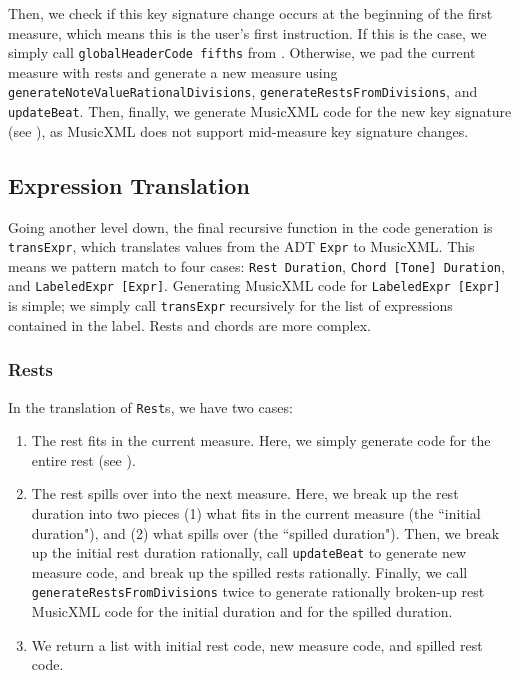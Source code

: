 \documentclass{report}
\begin{document}
Then, we check if this key signature change occurs at the beginning of the first measure, which means this is the user's first instruction. If this is the case, we simply call \verb.globalHeaderCode fifths. from . Otherwise, we pad the current measure with rests and generate a new measure using \verb.generateNoteValueRationalDivisions., \verb.generateRestsFromDivisions., and \verb.updateBeat.. Then, finally, we generate MusicXML code for the new key signature (see ), as MusicXML does not support mid-measure key signature changes. 

\subsection{Expression Translation}

Going another level down, the final recursive function in the code generation is \verb.transExpr., which translates values from the ADT \verb.Expr. to MusicXML. This means we pattern match to four cases: \verb.Rest Duration., \verb.Chord [Tone] Duration., and \verb.LabeledExpr [Expr].. Generating MusicXML code for \verb.LabeledExpr [Expr]. is simple; we simply call \verb.transExpr. recursively for the list of expressions contained in the label. Rests and chords are more complex.

\subsubsection{Rests}

In the translation of \verb.Rest.s, we  have two cases:
\begin{enumerate}
\item The rest fits in the current measure. Here, we simply generate code for the entire rest (see ).

\item The rest spills over into the next measure. Here, we break up the rest duration into two pieces (1) what fits in the current measure (the ``initial duration"), and (2) what  spills over (the ``spilled duration"). Then, we break up the initial rest duration rationally,  call \verb.updateBeat. to generate new measure code, and break up the spilled rests rationally. Finally, we call \verb.generateRestsFromDivisions. twice to generate rationally broken-up rest MusicXML code for the initial duration and for the spilled duration. 

\item We return a list with initial rest code, new measure code, and spilled rest code. 
\end{enumerate}
\end{document}
